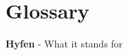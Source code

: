 \chapter*{Glossary}

\begin{description}
\item \textbf{Hyfen} - What it stands for


 




\end{description}





